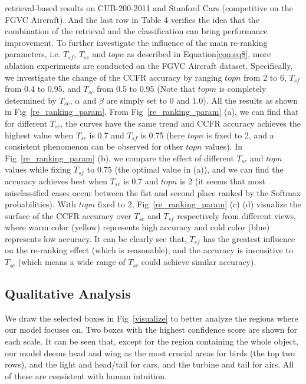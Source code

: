 \documentclass[10pt,twocolumn,letterpaper]{article}
\begin{document}
retrieval-based results on CUB-200-2011 and Stanford Cars (competitive on the FGVC Aircraft). And the last row in Table 4 verifies the idea that the combination of the retrieval and the classification can bring performance improvement. To further investigate the influence of the main re-ranking parameters, i.e. $T_{sf}$, $T_{sc}$ and $topn$ as described in Equation\ref{con:eq8}, more ablation experiments are conducted on the FGVC Aircraft dataset. Specifically, we investigate the change of the CCFR accuracy by ranging $topn$ from 2 to 6, $T_{sf}$ from 0.4 to 0.95, and $T_{sc}$ from 0.5 to 0.95 (Note that $topm$ is completely determined by $T_{sc}$, $\alpha$ and $\beta$ are simply set to 0 and 1.0). All the results as shown in Fig~\ref{re_ranking_param}. From Fig~\ref{re_ranking_param} (a), we can find that for different $T_{sc}$, the curves have the same trend and CCFR accuracy achieves the highest value when $T_{sc}$ is 0.7 and $T_{sf}$ is 0.75 (here $topn$ is fixed to 2, and a consistent phenomenon can be observed for other $topn$ values). In Fig~\ref{re_ranking_param} (b), we compare the effect of different $T_{sc}$ and $topn$ values while fixing $T_{sf}$ to 0.75 (the optimal value in (a)), and we can find the accuracy achieves best when $T_{sc}$ is 0.7 and $topn$ is 2 (it seems that most misclassified cases occur between the fist and second place ranked by the Softmax probabilities). With $topn$ fixed to 2, Fig~\ref{re_ranking_param} (c) (d) visualize the surface of the CCFR accuracy over $T_{sc}$ and $T_{sf}$ respectively from different views, where warm color (yellow) represents high accuracy and cold color  (blue) represents low accuracy. It can be clearly see that, $T_{sf}$ has the greatest influence on the re-ranking effect (which is reasonable), and the accuracy is insensitive to $T_{sc}$ (which means a wide range of $T_{sc}$ could achieve similar accuracy).
 
















\subsection{Qualitative Analysis}
We draw the selected boxes in Fig~\ref{visualize} to better analyze the regions where our model focuses on. Two boxes with the highest confidence score are shown for each scale. 
It can be seen that, except for the region containing the whole object, our model deems head and wing as the most crucial areas for birds (the top two rows), and the light and head/tail for cars, and the turbine and tail for airs. All of these are consistent with human intuition.
\end{document}
